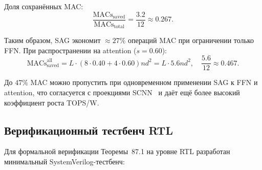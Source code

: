 Доля сохранённых MAC:
\begin{equation}
  \frac{\text{MACs}_{\text{saved}}}{\text{MACs}_{\text{total}}}
  = \frac{3{.}2}{12} \approx 0{.}267.
  \label{eq:mac-fraction}
\end{equation}

Таким образом, SAG экономит $\approx 27\%$ операций MAC при
ограничении только FFN.  При распространении на attention ($s = 0{.}60$):
\begin{equation}
  \text{MACs}_{\text{saved}}^{\text{all}} = L \cdot (8 \cdot 0{.}40 + 4 \cdot 0{.}60) n d^2
  = L \cdot 5{.}6 n d^2,
  \quad
  \frac{5{.}6}{12} \approx 0{.}467.
  \label{eq:mac-saved-all}
\end{equation}

До $47\%$ MAC можно пропустить при одновременном применении SAG
к FFN и attention, что согласуется с проекциями SCNN~\cite{parashar2017scnn}
и даёт ещё более высокий коэффициент роста TOPS/W.

\subsection{Верификационный тестбенч RTL}
\label{ssec:glava87-testbench}

Для формальной верификации Теоремы~87.1 на уровне RTL разработан
минимальный SystemVerilog-тестбенч:

